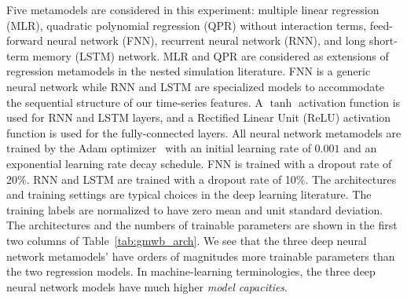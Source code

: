 \documentclass{article}
\begin{document}
Five metamodels are considered in this experiment: multiple linear regression (MLR), quadratic polynomial regression (QPR) without interaction terms, feed-forward neural network (FNN), recurrent neural network (RNN), and long short-term memory (LSTM) network.
MLR and QPR are considered as extensions of regression metamodels in the nested simulation literature.
FNN is a generic neural network while RNN and LSTM are specialized models to accommodate the sequential structure of our time-series features.
A $\tanh$ activation function is used for RNN and LSTM layers, and a Rectified Linear Unit (ReLU) activation function is used for the fully-connected layers.
All neural network metamodels are trained by the Adam optimizer~\citep{kingma2014adam} with an initial learning rate of $0.001$ and an exponential learning rate decay schedule.
FNN is trained with a dropout rate of 20\%.
RNN and LSTM are trained with a dropout rate of 10\%.
The architectures and training settings are typical choices in the deep learning literature.
The training labels are normalized to have zero mean and unit standard deviation.
The architectures and the numbers of trainable parameters are shown in the first two columns of Table~\ref{tab:gmwb_arch}.
We see that the three deep neural network metamodels' have orders of magnitudes more trainable parameters than the two regression models.
In machine-learning terminologies, the three deep neural network models have much higher \textit{model capacities}.
\end{document}
